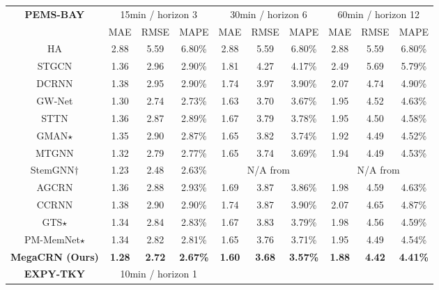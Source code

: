 \documentclass[letterpaper]{article} \usepackage{aaai23}  \usepackage{times}  \usepackage{helvet}  \usepackage{courier}  \usepackage[hyphens]{url}  \usepackage{graphicx} \urlstyle{rm} \def\UrlFont{\rm}  \usepackage{natbib}  \usepackage{caption} \usepackage{multirow}
\begin{document}
\begin{table*}[h]
{\begin{tabular*}{17.6cm}{@{\extracolsep{\fill}}cccccccccc}
\hline
		\multirow{2}{*}{\textbf{PEMS-BAY}} & \multicolumn{3}{c}{15min / horizon 3} &
		\multicolumn{3}{c}{30min / horizon 6} &
		\multicolumn{3}{c}{60min / horizon 12} \\
		\cline{2-4} \cline{5-7} \cline{8-10}
		\multicolumn{1}{l}{} & 
		\multicolumn{1}{c}{MAE} & 
		\multicolumn{1}{c}{RMSE} &
		\multicolumn{1}{c}{MAPE} &
		\multicolumn{1}{c}{MAE} & 
		\multicolumn{1}{c}{RMSE} &
		\multicolumn{1}{c}{MAPE} &
		\multicolumn{1}{c}{MAE} & 
		\multicolumn{1}{c}{RMSE} &
		\multicolumn{1}{c}{MAPE} \\
		\hline
		HA\cite{li2018diffusion} & 2.88 & 5.59 & 6.80\% & 2.88 & 5.59 & 6.80\% & 2.88 & 5.59 & 6.80\% \\
		STGCN\cite{yu2018spatio} & 1.36 & 2.96 & 2.90\% & 1.81 & 4.27 & 4.17\% & 2.49 & 5.69 & 5.79\% \\
		DCRNN\cite{li2018diffusion} & 1.38 & 2.95 & 2.90\% & 1.74 & 3.97 & 3.90\% & 2.07 & 4.74 & 4.90\% \\
		GW-Net\cite{wu2019graph} & 1.30 & 2.74 & 2.73\% & 1.63 & 3.70 & 3.67\% & 1.95 & 4.52 & 4.63\% \\
		STTN\cite{xu2020spatial} & 1.36 & 2.87 & 2.89\% & 1.67 & 3.79 & 3.78\% & 1.95 & 4.50 & 4.58\% \\
GMAN\cite{zheng2020gman}$\star$ & 1.35 & 2.90 & 2.87\% & 1.65 & 3.82 & 3.74\% & 1.92 & 4.49 & 4.52\% \\ MTGNN\cite{wu2020connecting} & 1.32 & 2.79 & 2.77\% & 1.65 & 3.74 & 3.69\% & 1.94 & 4.49 & 4.53\% \\
		StemGNN\cite{cao2020spectral}$\dagger$ & 1.23 & 2.48 & 2.63\% & \multicolumn{3}{c}{N/A from \cite{cao2020spectral}} & \multicolumn{3}{c}{N/A from \cite{cao2020spectral}} \\
		AGCRN\cite{bai2020adaptive} & 1.36 & 2.88 & 2.93\% & 1.69 & 3.87 & 3.86\% & 1.98 & 4.59 & 4.63\% \\
        CCRNN\cite{ye2021coupled} & 1.38 & 2.90 & 2.90\% & 1.74 & 3.87 & 3.90\% & 2.07 & 4.65 & 4.87\% \\
GTS\cite{shang2021discrete}$\star$ & 1.34 & 2.84 & 2.83\% & 1.67 & 3.83 & 3.79\% & 1.98 & 4.56 & 4.59\% \\
PM-MemNet\cite{lee2021learning}$\star$ & 1.34 & 2.82 & 2.81\% & 1.65 & 3.76 & 3.71\% & 1.95 & 4.49 & 4.54\% \\
\textbf{MegaCRN (Ours)} & \textbf{1.28} & \textbf{2.72} & \textbf{2.67\%} & \textbf{1.60} & \textbf{3.68} & \textbf{3.57\%} & \textbf{1.88} & \textbf{4.42} & \textbf{4.41\%} \\
		\hline
		\multirow{2}{*}{\textbf{EXPY-TKY}} & \multicolumn{3}{c}{10min / horizon 1} &

\end{tabular*}}
\end{table*}
\end{document}
